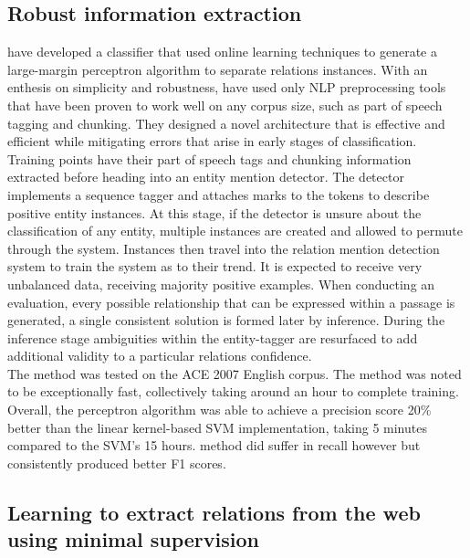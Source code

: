 \documentclass[12pt]{article} %
\begin{document}
\subsection{Robust information extraction}

\cite{robustPerceptron} have developed a classifier that used online learning techniques to generate a large-margin perceptron algorithm to separate relations instances. With an enthesis on simplicity and robustness, \cite{robustPerceptron} have used only NLP preprocessing tools that have been proven to work well on any corpus size, such as part of speech tagging and chunking. They designed a novel architecture that is effective and efficient while mitigating errors that arise in early stages of classification. Training points have their part of speech tags and chunking information extracted before heading into an entity mention detector. The detector implements a sequence tagger and attaches marks to the tokens to describe positive entity instances. At this stage, if the detector is unsure about the classification of any entity, multiple instances are created and allowed to permute through the system. Instances then travel into the relation mention detection system to train the system as to their trend. It is expected to receive very unbalanced data, receiving majority positive examples. When conducting an evaluation, every possible relationship that can be expressed within a passage is generated, a single consistent solution is formed later by inference. During the inference stage ambiguities within the entity-tagger are resurfaced to add additional validity to a particular relations confidence.\\

The method was tested on the ACE 2007 English corpus. The method was noted to be exceptionally fast, collectively taking around an hour to complete training. Overall, the perceptron algorithm was able to achieve a precision score 20\% better than the linear kernel-based SVM implementation, taking 5 minutes compared to the SVM’s 15 hours. \cite{robustPerceptron} method did suffer in recall however but consistently produced better F1 scores.

\subsection{Learning to extract relations from the web using minimal supervision}
\end{document}
